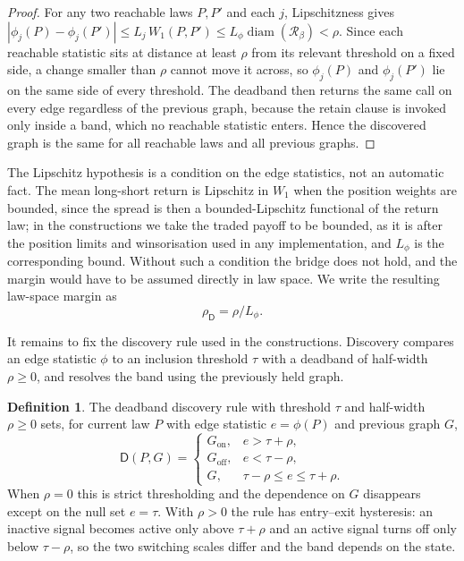 \documentclass[11pt]{article}
\theoremstyle{plain}
\theoremstyle{definition}
\newtheorem{definition}{Definition}
\newcommand{\Rset}{\mathcal{R}}
\newcommand{\Wone}{W_1}
\newcommand{\Dop}{\mathsf{D}}
\newcommand{\diam}{\operatorname{diam}}
\begin{document}
\begin{proof}
For any two reachable laws $P,P'$ and each $j$, Lipschitzness gives $|\phi_j(P)-\phi_j(P')|\le L_j\,\Wone(P,P')\le L_\phi\diam(\Rset_\beta)<\rho$. Since each reachable statistic sits at distance at least $\rho$ from its relevant threshold on a fixed side, a change smaller than $\rho$ cannot move it across, so $\phi_j(P)$ and $\phi_j(P')$ lie on the same side of every threshold. The deadband then returns the same call on every edge regardless of the previous graph, because the retain clause is invoked only inside a band, which no reachable statistic enters. Hence the discovered graph is the same for all reachable laws and all previous graphs.
\end{proof}

The Lipschitz hypothesis is a condition on the edge statistics, not an automatic fact. The mean long-short return is Lipschitz in $\Wone$ when the position weights are bounded, since the spread is then a bounded-Lipschitz functional of the return law; in the constructions we take the traded payoff to be bounded, as it is after the position limits and winsorisation used in any implementation, and $L_\phi$ is the corresponding bound. Without such a condition the bridge does not hold, and the margin would have to be assumed directly in law space. We write the resulting law-space margin as
\begin{equation}\label{eq:bridge}
\rho_\Dop=\rho/L_\phi.
\end{equation}

It remains to fix the discovery rule used in the constructions. Discovery compares an edge statistic $\phi$ to an inclusion threshold $\tau$ with a deadband of half-width $\rho\ge0$, and resolves the band using the previously held graph.

\begin{definition}\label{def:deadband}
The deadband discovery rule with threshold $\tau$ and half-width $\rho\ge0$ sets, for current law $P$ with edge statistic $e=\phi(P)$ and previous graph $G$,
\[
\Dop(P,G)=\begin{cases}
G_{\mathrm{on}}, & e>\tau+\rho,\\
G_{\mathrm{off}}, & e<\tau-\rho,\\
G, & \tau-\rho\le e\le\tau+\rho.
\end{cases}
\]
When $\rho=0$ this is strict thresholding and the dependence on $G$ disappears except on the null set $e=\tau$. With $\rho>0$ the rule has entry--exit hysteresis: an inactive signal becomes active only above $\tau+\rho$ and an active signal turns off only below $\tau-\rho$, so the two switching scales differ and the band depends on the state.
\end{definition}
\end{document}

